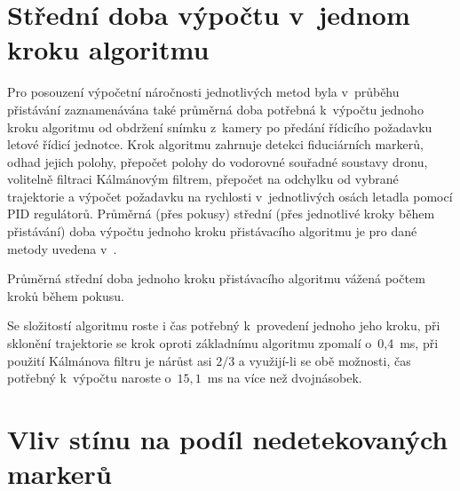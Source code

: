   \section{Střední doba výpočtu v~jednom kroku algoritmu} \label{sec:stredniDobaVypoctu}
    Pro posouzení výpočetní náročnosti jednotlivých metod byla v~průběhu přistávání zaznamenávána také průměrná doba potřebná k~výpočtu jednoho kroku algoritmu od obdržení snímku z~kamery po předání řídicího požadavku letové řídicí jednotce. Krok algoritmu zahrnuje detekci fiduciárních markerů, odhad jejich polohy, přepočet polohy do vodorovné souřadné soustavy dronu, volitelně filtraci Kálmánovým filtrem, přepočet na odchylku od vybrané trajektorie a výpočet požadavku na rychlosti v~jednotlivých osách letadla pomocí PID regulátorů. Průměrná (přes pokusy) střední (přes jednotlivé kroky během přistávání) %
    doba výpočtu jednoho kroku přistávacího algoritmu je pro dané metody uvedena v~.

    \begin{table}
      \centering
      
      \caption[Průměrná střední doba jednoho kroku algoritmu]{Průměrná střední doba jednoho kroku přistávacího algoritmu vážená počtem kroků během pokusu.}
      \label{tab:dobaKroku}
    \end{table}

    Se složitostí algoritmu roste i čas potřebný k~provedení jednoho jeho kroku, při sklonění trajektorie se krok oproti základnímu algoritmu zpomalí o~0{,}4~ms, při použití Kálmánova filtru je nárůst asi $2/3$ a využijí-li se obě možnosti, čas potřebný k~výpočtu naroste o~$15{,}1$~ms na více než dvojnásobek.
  \section{Vliv stínu na podíl nedetekovaných markerů} \label{sec:stin}%
    
